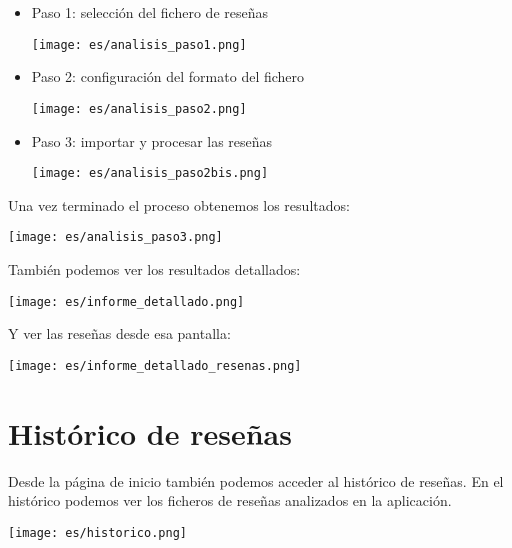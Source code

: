 \documentclass{ol-softwaremanual}
\begin{document}
\begin{itemize}
    \item Paso 1: selección del fichero de reseñas
    
    \vspace{20pt}
    \centerline{\texttt{[image: es/analisis\_paso1.png]}}
    \vspace{20pt}

    \item Paso 2: configuración del formato del fichero
    
    \vspace{20pt}
    \centerline{\texttt{[image: es/analisis\_paso2.png]}}
    \vspace{20pt}

    \item Paso 3: importar y procesar las reseñas
    
    \vspace{20pt}
    \centerline{\texttt{[image: es/analisis\_paso2bis.png]}}
    \vspace{20pt}
\end{itemize}

\newpage

Una vez terminado el proceso obtenemos los resultados:

\vspace{20pt}
\centerline{\texttt{[image: es/analisis\_paso3.png]}}
\vspace{20pt}

También podemos ver los resultados detallados:

\vspace{20pt}
\centerline{\texttt{[image: es/informe\_detallado.png]}}
\vspace{20pt}

Y ver las reseñas desde esa pantalla:

\vspace{20pt}
\centerline{\texttt{[image: es/informe\_detallado\_resenas.png]}}
\vspace{20pt}

\newpage
\section{Histórico de reseñas}
Desde la página de inicio también podemos acceder al histórico de reseñas. En el histórico podemos ver los ficheros de reseñas analizados en la aplicación.

\vspace{20pt}
\centerline{\texttt{[image: es/historico.png]}}
\vspace{20pt}
\end{document}
